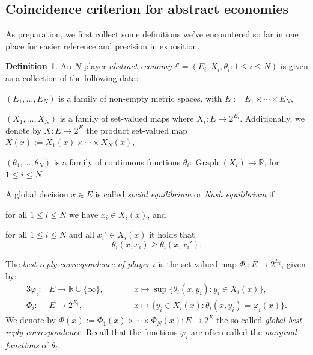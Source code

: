 \documentclass[a4paper,11pt,reqno,english]{amsart}
\theoremstyle{definition}
\newtheorem{definition}[theorem]{Definition}
\newcommand\R{\mathbb R}
\begin{document}
\subsection{Coincidence criterion for abstract economies}
As preparation, we first collect some definitions we've encountered so far in one place for easier reference and precision in exposition.

\begin{definition}\label{def:AbstractEconomyAndRelatedNotions}
	An $N$-player \textit{abstract economy} $\mathcal{E}=(E_i,X_i,\theta_i\colon 1\leq i\leq N)$ is given as a collection of the following data:

	\begin{compactitem}[\quad --]
		\item $(E_1,\dots,E_N)$ is a family of non-empty metric spaces, with $E:=E_1\times \cdots\times E_N$,
		\item $(X_1,\dots,X_N)$ is a family of set-valued maps where $X_i\colon E\longrightarrow 2^{E_i}$. Additionally, we denote by $X\colon E\longrightarrow 2^E$ the product set-valued map $X(x):= X_1(x)\times\cdots\times X_N(x)$,
		\item $(\theta_1,\dots,\theta_N)$ is a family of continuous functions $\theta_i\colon\operatorname{Graph}(X_i)\longrightarrow\R$, for $1\leq i\leq N$.
	\end{compactitem}

	\medskip\noindent
	A global decision $x \in E$ is called \textit{social equilibrium} or \textit{Nash equilibrium} if
	\begin{compactitem}[\quad --]
		\item for all $1\leq i \leq N$ we have $x_i\in X_i(x)$, and
		\item for all $1\leq i \leq N$ and all $x_i'\in X_i(x)$ it holds that
		\begin{displaymath}
			\theta_i(x,x_i) \geq \theta_i(x,x_i').
		\end{displaymath}
	\end{compactitem}

	\medskip\noindent
	The \textit{best-reply correspondence of player} $i$ is the set-valued map $\Phi_i\colon E\longrightarrow 2^{E_i}$, given by:
	\begin{alignat*}{3}
		\varphi_i\colon & E\longrightarrow\mathbb{R}\cup\{\infty\}, & \qquad & x \longmapsto  \sup\{\theta_i(x, y_i) \colon y_i\in X_i(x)\},            \\
		\Phi_i\colon    & E\longrightarrow 2^{E_i},                 & \qquad & x \longmapsto    \{y_i\in X_i(x)\colon \theta_i(x,y_i) = \varphi_i(x)\}.
	\end{alignat*}
	We denote by $\Phi(x):=\Phi_1(x)\times\cdots\times\Phi_N(x)\colon E\longrightarrow 2^{E}$ the so-called \textit{global best-reply correspondence}. Recall that the functions $\varphi_i$ are often called the \textit{marginal functions} of $\theta_i$.
\end{definition}
\end{document}
